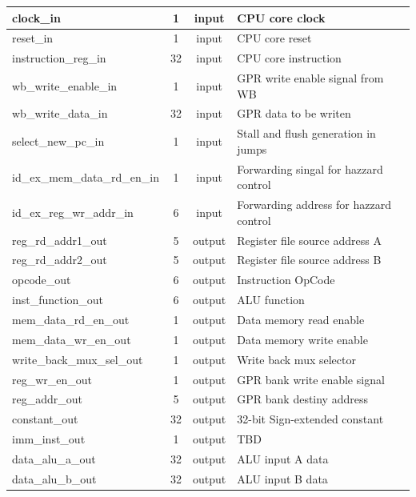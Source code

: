 \documentclass{article}
\begin{document}
\begin{center}
\begin{longtable}[pos]{| l | c | c | m{7cm} |}
      	clock\_in 		          & 1 	& input 	& CPU core clock  	\\ \hline
      	reset\_in 		          & 1	  & input		& CPU core reset  	\\ \hline
      	instruction\_reg\_in    & 32	& input 	& CPU core instruction \\ \hline
        wb\_write\_enable\_in   & 1   & input   & GPR write enable signal from WB    \\ \hline
      	wb\_write\_data\_in     & 32   & input  & GPR data to be writen   \\ \hline
        select\_new\_pc\_in     & 1   & input   & Stall and flush generation in jumps    \\ \hline
        id\_ex\_mem\_data\_rd\_en\_in & 1   & input   & Forwarding singal for hazzard control    \\ \hline
        id\_ex\_reg\_wr\_addr\_in & 6   & input   & Forwarding address for hazzard control    \\ \hline
        reg\_rd\_addr1\_out     & 5	  & output 	& Register file source address A \\ \hline
        reg\_rd\_addr2\_out     & 5   & output  & Register file source address B \\ \hline
      	opcode\_out 	          & 6	  & output 	& Instruction OpCode  \\ \hline
        inst\_function\_out     & 6   & output  & ALU function  \\ \hline
      	mem\_data\_rd\_en\_out  & 1   & output  & Data memory read enable  \\ \hline
        mem\_data\_wr\_en\_out 	& 1	  & output 	& Data memory write enable  \\ \hline
      	write\_back\_mux\_sel\_out 	& 1	& output	  & Write back mux selector \\ \hline
      	reg\_wr\_en\_out 	      & 1	  & output 	& GPR bank write enable signal  \\ \hline
      	reg\_addr\_out          & 5   & output  & GPR bank destiny address \\ \hline
        constant\_out 	        & 32  & output 	& 32-bit Sign-extended constant  \\ \hline
        imm\_inst\_out          & 1   & output  & TBD  \\ \hline
        data\_alu\_a\_out       & 32  & output  & ALU input A data \\ \hline
        data\_alu\_b\_out       & 32  & output  & ALU input B data \\ \hline

\end{longtable}
\end{center}
\end{document}
